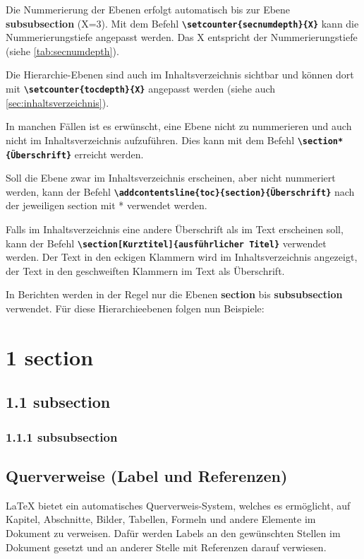 
Die Nummerierung der Ebenen erfolgt automatisch bis zur Ebene \textbf{subsubsection} (X=3).
Mit dem Befehl \textbf{\texttt{\textbackslash setcounter\{secnumdepth\}\{X\}}} kann die Nummerierungstiefe angepasst werden. Das X entspricht der Nummerierungstiefe (siehe \autoref{tab:secnumdepth}).


Die Hierarchie-Ebenen sind auch im Inhaltsverzeichnis sichtbar und können dort mit \textbf{\texttt{\textbackslash setcounter\{tocdepth\}\{X\}}} angepasst werden (siehe auch \ref{sec:inhaltsverzeichnis}).

In manchen Fällen ist es erwünscht, eine Ebene nicht zu nummerieren und auch nicht im Inhaltsverzeichnis aufzuführen. Dies kann mit dem Befehl \textbf{\texttt{\textbackslash section*\{Überschrift\}}} erreicht werden.

Soll die Ebene zwar im Inhaltsverzeichnis erscheinen, aber nicht nummeriert werden, kann der Befehl \textbf{\texttt{\textbackslash addcontentsline\{toc\}\{section\}\{Überschrift\}}} nach der jeweiligen section mit * verwendet werden.

Falls im Inhaltsverzeichnis eine andere Überschrift als im Text erscheinen soll, kann der Befehl \textbf{\texttt{\textbackslash section[Kurztitel]\{ausführlicher Titel\}}} verwendet werden. Der Text in den eckigen Klammern wird im Inhaltsverzeichnis angezeigt, der Text in den geschweiften Klammern im Text als Überschrift.

In Berichten werden in der Regel nur die Ebenen \textbf{section} bis \textbf{subsubsection} verwendet. Für diese Hierarchieebenen folgen nun Beispiele:
\section*{1 \hspace{0.15cm} section}

\subsection*{1.1 \hspace{0.15cm} subsection}

\subsubsection*{1.1.1 \hspace{0.15cm} subsubsection}

\newpage

\subsection{Querverweise (Label und Referenzen)}
\label{sec:querverweise}
\LaTeX{} bietet ein automatisches Querverweis-System, welches es ermöglicht, auf Kapitel, Abschnitte, Bilder, Tabellen, Formeln und andere Elemente im Dokument zu verweisen.
Dafür werden Labels an den gewünschten Stellen im Dokument gesetzt und an anderer Stelle mit Referenzen darauf verwiesen.

